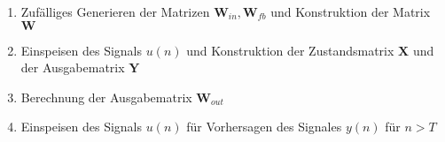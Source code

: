 \singlespacing
\begin{enumerate}
	\item Zufälliges Generieren der Matrizen $\mathbf{W}_{in}, \mathbf{W}_{fb}$ und Konstruktion der Matrix $\mathbf{W}$ 
	\item Einspeisen des Signals $u(n)$ und Konstruktion der Zustandsmatrix $\mathbf{X}$ und der Ausgabematrix $\mathbf{Y}$ 
	\item Berechnung der Ausgabematrix $\mathbf{W}_{out}$
	\item Einspeisen des Signals $u(n)$ für Vorhersagen des Signales $y(n)$ für $n > T$
\end{enumerate}
\onehalfspacing